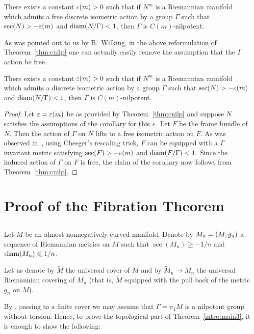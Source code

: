 \documentclass{amsart}
\begin{document}
There exists a constant $\varepsilon(m)>0$ such that if $N^m$  is a Riemannian manifold which admits a free discrete isometric action by a  group $\Gamma$
such that $\sec(N)\z> -\eps(m)$ and $\operatorname{\rm diam}(N/\Gamma)<1$,
then $\Gamma$ is $C(m)$-nilpotent.


As was pointed out to us by B.~Wilking,
in the above reformulation of Theorem~\ref{thm:cnilp}
one can actually easily remove the assumption
that the $\Gamma$ action be free.

\begin{cor}\label{cor:nonfree}
There exists a constant $\varepsilon(m)>0$ such that
if $N^m$  is a Riemannian manifold
which admits a discrete  isometric action by a  group $\Gamma$
such that $\sec(N)> -\varepsilon(m)$ and $\operatorname{\rm diam}(N/\Gamma)<1$,
then $\Gamma$ is $C(m)$-nilpotent.
\end{cor}
\begin{proof}
Let $\varepsilon=\varepsilon(m)$ be as provided by Theorem~\ref{thm:cnilp}
and suppose $N$ satisfies the assumptions of the corollary for this $\varepsilon$.
Let $F$ be the frame bundle of $N$.
Then the action of $\Gamma$ on $N$ lifts to a free isometric action on $F$.
As was observed in~\cite{FY},
using Cheeger's rescaling trick,
$F$ can be equipped with a $\Gamma$ invariant metric
satisfying $\sec(F)>-\varepsilon(m)$ and $\operatorname{\rm diam}(F/\Gamma)<1$.
Since the induced action of $\Gamma$ on $F$ is free,
the claim of the corollary now follows from Theorem~\ref{thm:cnilp}.
\end{proof}




\section{Proof of the Fibration Theorem}\label{sec:fib}
\subsection{} Let $M$ be an almost nonnegatively curved manifold.
Denote by $M_n\z=(M,g_n)$
a sequence of Riemannian metrics on $M$ such that $\sec(M_n)\ge -1/n$
and $\operatorname{\rm diam}(M_n)\leqslant 1/n$.

Let us denote by $\tilde M$ the universal cover of $M$ and by
$\tilde M_n\to M_n$
the universal Riemannian covering of $M_n$
(that is, $\tilde M$ equipped with the pull back of the metric $g_n$ on $M$).

By \cite{FY}, passing to a finite cover
we may assume that $\Gamma=\pi_1M$ is a nilpotent group without torsion.
Hence, to prove the topological part of Theorem~\ref{intro:main3},
it is enough to show the following:
\end{document}
